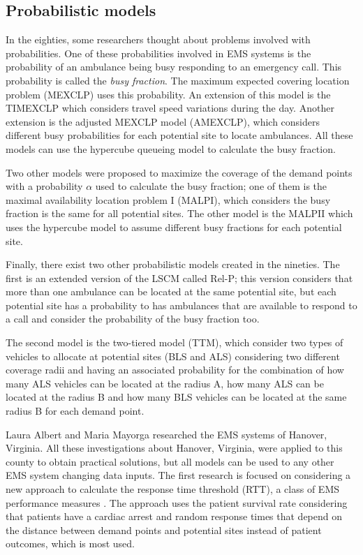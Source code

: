 \subsection{Probabilistic models}

In the eighties, some researchers thought about problems involved with probabilities. One of these probabilities involved in EMS systems is the probability of an ambulance being busy responding to an emergency call. This probability is called the \textit{busy fraction}. The maximum expected covering location problem (MEXCLP) uses this probability. An extension of this model is the TIMEXCLP which considers travel speed variations during the day. Another extension is the adjusted MEXCLP model (AMEXCLP), which considers different busy probabilities for each potential site to locate ambulances. All these models can use the hypercube queueing model to calculate the busy fraction\cite{galvao2008emergency}.

Two other models were proposed to maximize the coverage of the demand points with a probability $\alpha$ used to calculate the busy fraction; one of them is the maximal availability location problem I (MALPI), which considers the busy fraction is the same for all potential sites. The other model is the MALPII which uses the hypercube model to assume different busy fractions for each potential site.

Finally, there exist two other probabilistic models created in the nineties. The first is an extended version of the LSCM called Rel-P; this version considers that more than one ambulance can be located at the same potential site, but each potential site has a probability to has ambulances that are available to respond to a call and consider the probability of the busy fraction too. 

The second model is the two-tiered model (TTM), which consider two types of vehicles to allocate at potential sites (BLS and ALS) considering two different coverage radii and having an associated probability for the combination of how many ALS vehicles can be located at the radius A, how many ALS can be located at the radius B and how many BLS vehicles can be located at the same radius B for each demand point. 

Laura Albert and Maria Mayorga researched the EMS systems of Hanover, Virginia. All these investigations about Hanover, Virginia, were applied to this county to obtain practical solutions, but all models can be used to any other EMS system changing data inputs.
The first research is focused on considering a new approach to calculate the response time threshold (RTT), a class of EMS performance measures \cite{mclay2010evaluating}. The approach uses the patient survival rate considering that patients have a cardiac arrest and random response times that depend on the distance between demand points and potential sites instead of patient outcomes, which is most used. 

